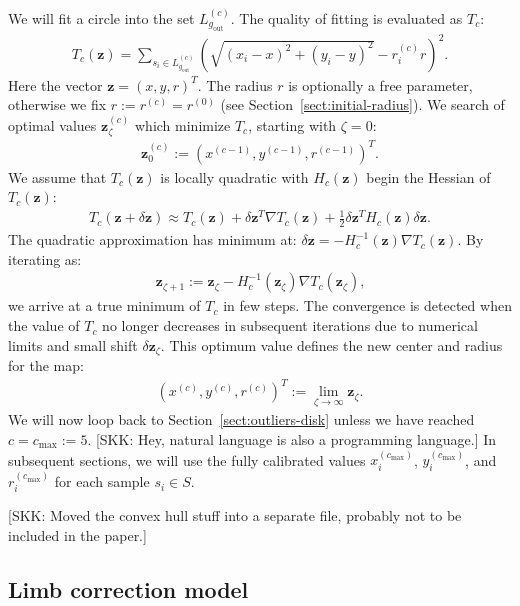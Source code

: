 \documentclass{aa}
\newcommand{\skk}[1]{\textcolor{midorange}{[SKK: #1]}} %
\newcommand{\eqnl}[2]{\begin{eqnarray}\label{#1}#2\end{eqnarray}}
\newcommand{\s}[2]{{#1}_{\mathrm{#2}}}
\begin{document}
  We will fit a circle into the set $L^{(c)}_{\s{g}{out}}$. The quality of fitting is evaluated as $T_c$:
  \eqnl{subsequent_centering1}{
  T_c(\bm{z}) = \sum \limits_{s_i \in L^{(c)}_{\s{g}{out}}} \left( \sqrt{\left( x_i - x \right)^2 + \left( y_i - y \right)^2} - r_i^{(c)} r \right)^2 \text{.}
  }
  Here the vector $\bm{z} = \left( x, y, r \right)^T$.
  The radius $r$ is optionally a free parameter, otherwise we fix $r := r^{(c)} = r^{(0)}$ (see 
  Section~\ref{sect:initial-radius}). We search of optimal values $\bm{z}_{\zeta}^{(c)}$ which minimize $T_c$, starting with $\zeta=0$:
  \eqnl{subsequent_centering2}{
  \bm{z}_0^{(c)} := \left( x^{(c-1)}, y^{(c-1)}, r^{(c-1)} \right)^T \text{.}
  }
  We assume that $T_c(\bm{z})$ is locally quadratic with $H_c(\bm{z})$ begin the Hessian of $T_c(\bm{z})$:
  \eqnl{subsequent_centering3}{
  T_c(\bm{z}+\delta \bm{z}) \approx T_c(\bm{z}) + \delta \bm{z}^T \nabla T_c(\bm{z}) + \frac{1}{2} \delta \bm{z}^T H_c(\bm{z}) \delta \bm{z} \text{.}
  }
  The quadratic approximation has minimum at: $\delta \bm{z} = -H_c^{-1}(\bm{z}) \nabla T_c(\bm{z})$. By iterating as:
  \eqnl{subsequent_centering4}{
  \bm{z}_{\zeta+1} := \bm{z}_{\zeta} - H_c^{-1}(\bm{z}_{\zeta}) \nabla T_c(\bm{z}_{\zeta}) \text{,}
  }
  we arrive at a true minimum of $T_c$ in few steps. The convergence is detected when the value of $T_c$ no longer 
  decreases in subsequent iterations due to numerical limits and small shift $\delta \bm{z}_{\zeta}$. This optimum value defines the new center and radius for the map:
  \eqnl{subsequent_centering5}{
  \left( x^{(c)}, y^{(c)}, r^{(c)} \right)^T := \lim \limits_{\zeta \to \infty} \bm{z}_{\zeta} \text{.}
  }
  We will now loop back to Section~\ref{sect:outliers-disk} unless we have reached $c = \s{c}{max} := 5$. \skk{Hey, natural language is also a programming language.}
  In subsequent sections, we will use the fully calibrated values $x_i^{(\s{c}{max})}$, $y_i^{(\s{c}{max})}$, and $r_i^{(\s{c}{max})}$ for each sample $s_i \in S$.

\skk{Moved the convex hull stuff into a separate file, probably not to be included in the paper.}

\subsection{Limb correction model}\label{sect:limb}
\end{document}
